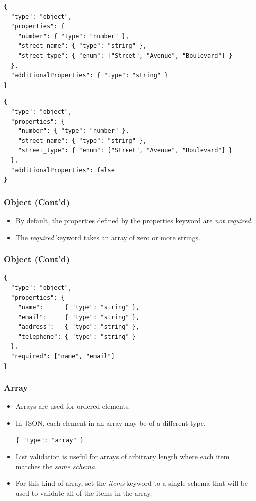 \documentclass{efd-lecture}
\begin{document}
\begin{frame}[fragile]
  \scriptsize
  \begin{verbatim}
{
  "type": "object",
  "properties": {
    "number": { "type": "number" },
    "street_name": { "type": "string" },
    "street_type": { "enum": ["Street", "Avenue", "Boulevard"] }
  },
  "additionalProperties": { "type": "string" }
}
  \end{verbatim}
  \begin{verbatim}
{
  "type": "object",
  "properties": {
    "number": { "type": "number" },
    "street_name": { "type": "string" },
    "street_type": { "enum": ["Street", "Avenue", "Boulevard"] }
  },
  "additionalProperties": false
}
  \end{verbatim}
\end{frame}

\begin{frame}
  \frametitle{Object (Cont'd)}
  \begin{itemize}
    \item
      By default, the properties defined by the properties keyword are
      \textit{\color{RubineRed}not required}.
    \item
      The \textit{\color{YellowOrange}required} keyword takes an array of
      zero or more strings.
  \end{itemize}
\end{frame}

\begin{frame}[fragile]
  \frametitle{Object (Cont'd)}
  \begin{verbatim}
{
  "type": "object",
  "properties": {
    "name":      { "type": "string" },
    "email":     { "type": "string" },
    "address":   { "type": "string" },
    "telephone": { "type": "string" }
  },
  "required": ["name", "email"]
}
  \end{verbatim}
\end{frame}

\begin{frame}[fragile]
  \frametitle{Array}
  \begin{itemize}
    \item Arrays are used for ordered elements.
    \item In JSON, each element in an array may be of a different type.
    \begin{verbatim}
{ "type": "array" }
    \end{verbatim}
    \item
      List validation is useful for arrays of arbitrary length where each item
      matches the \textit{\color{Yellow} same schema}.
    \item
      For this kind of array, set the
      \textit{\color{YellowOrange} items} keyword to a single schema that
      will be used to validate all of the items in the array.
  \end{itemize}
\end{frame}
\end{document}
